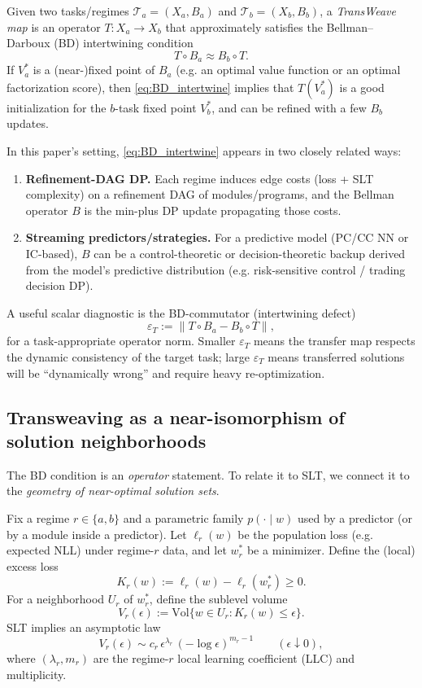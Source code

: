 \documentclass[11pt]{article}
\newcommand{\Vol}{\mathrm{Vol}}
\begin{document}
Given two tasks/regimes $\mathcal{T}_a=(X_a,B_a)$ and $\mathcal{T}_b=(X_b,B_b)$, a \emph{TransWeave map}
is an operator $T : X_a \to X_b$ that approximately satisfies the Bellman--Darboux (BD) intertwining condition
\begin{equation}
T \circ B_a \approx B_b \circ T .
\label{eq:BD_intertwine}
\end{equation}
If $V_a^\ast$ is a (near-)fixed point of $B_a$ (e.g. an optimal value function or an optimal
factorization score), then \eqref{eq:BD_intertwine} implies that $T(V_a^\ast)$ is a good initialization
for the $b$-task fixed point $V_b^\ast$, and can be refined with a few $B_b$ updates.

In this paper's setting, \eqref{eq:BD_intertwine} appears in two closely related ways:
\begin{enumerate}
\item \textbf{Refinement-DAG DP.} Each regime induces edge costs (loss + SLT complexity) on a
refinement DAG of modules/programs, and the Bellman operator $B$ is the min-plus DP update
propagating those costs.
\item \textbf{Streaming predictors/strategies.} For a predictive model (PC/CC NN or IC-based),
$B$ can be a control-theoretic or decision-theoretic backup derived from the model's predictive
distribution (e.g. risk-sensitive control / trading decision DP).
\end{enumerate}

A useful scalar diagnostic is the BD-commutator (intertwining defect)
\begin{equation}
\varepsilon_T := \|T \circ B_a - B_b \circ T\|,
\label{eq:BD_defect}
\end{equation}
for a task-appropriate operator norm. Smaller $\varepsilon_T$ means the transfer map respects
the dynamic consistency of the target task; large $\varepsilon_T$ means transferred solutions will be
``dynamically wrong'' and require heavy re-optimization.

\subsection{Transweaving as a near-isomorphism of solution neighborhoods}
The BD condition is an \emph{operator} statement. To relate it to SLT, we connect it to the
\emph{geometry of near-optimal solution sets}.

Fix a regime $r \in \{a,b\}$ and a parametric family $p(\cdot \mid w)$ used by a predictor
(or by a module inside a predictor). Let $\ell_r(w)$ be the population loss (e.g. expected NLL)
under regime-$r$ data, and let $w_r^\ast$ be a minimizer. Define the (local) excess loss
\[
K_r(w) := \ell_r(w) - \ell_r(w_r^\ast) \ge 0 .
\]
For a neighborhood $U_r$ of $w_r^\ast$, define the sublevel volume
\[
V_r(\epsilon) := \Vol\{w \in U_r : K_r(w) \le \epsilon\}.
\]
SLT implies an asymptotic law
\begin{equation}
V_r(\epsilon) \sim c_r\, \epsilon^{\lambda_r}\,(-\log\epsilon)^{m_r-1}
\qquad (\epsilon \downarrow 0),
\label{eq:SLT_sublevel}
\end{equation}
where $(\lambda_r,m_r)$ are the regime-$r$ local learning coefficient (LLC) and multiplicity.
\end{document}
